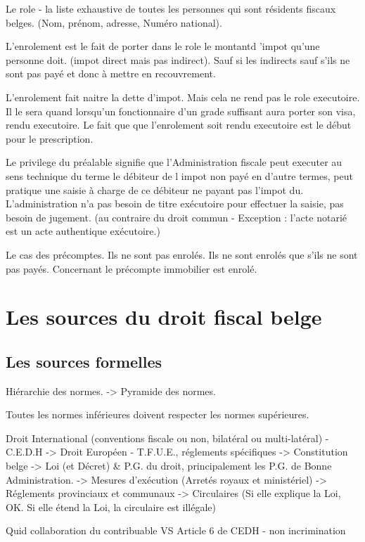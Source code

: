 \documentclass{book}
\begin{document}
Le role - la liste exhaustive de toutes les personnes qui sont résidents fiscaux belges. (Nom, prénom, adresse, Numéro national).

L'enrolement est le fait de porter dans le role le montantd 'impot qu'une personne doit. (impot direct mais pas indirect). Sauf si les indirects sauf s'ils ne sont pas payé et donc à mettre en recouvrement.

L'enrolement fait naitre la dette d'impot. Mais cela ne rend pas le role executoire. Il le sera quand lorsqu'un fonctionnaire d'un grade suffisant aura porter son visa, rendu executoire. Le fait que que l'enrolement soit rendu executoire est le début pour le prescription. 

Le privilege du préalable signifie que l'Administration fiscale peut executer au sens technique du terme le débiteur de l impot non payé en d'autre termes, peut pratique une saisie à charge de ce débiteur ne payant pas l'impot du. L'administration n'a pas besoin de titre exécutoire pour effectuer la saisie, pas besoin de jugement. (au contraire du droit commun - Exception : l'acte notarié est un acte authentique exécutoire.)

Le cas des précomptes. Ils ne sont pas enrolés. Ils ne sont enrolés que s'ils ne sont pas payés. Concernant le précompte immobilier est enrolé.

\chapter{Les sources du droit fiscal belge}

\section{Les sources formelles}

Hiérarchie des normes. -> Pyramide des normes.

Toutes les normes inférieures doivent respecter les normes supérieures.

Droit International (conventions fiscale ou non, bilatéral ou multi-latéral) - C.E.D.H
-> 
Droit Européen - T.F.U.E., réglements spécifiques
->
Constitution belge
-> 
Loi (et Décret) & P.G. du droit, principalement les P.G. de Bonne Administration.
->
Mesures d'exécution (Arretés royaux et ministériel)
->
Réglements provinciaux et communaux
->
Circulaires (Si elle explique la Loi, OK. Si elle étend la Loi, la circulaire est illégale)

Quid collaboration du contribuable VS Article 6 de CEDH - non incrimination
\end{document}

